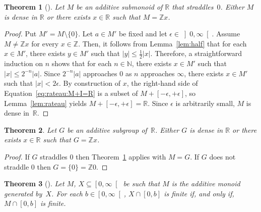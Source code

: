 \documentclass[12pt]{article}
\newcommand{\bZ}{\mathbb{Z}}
\newcommand{\bN}{\mathbb{N}} %
\newcommand{\bR}{\mathbb{R}}
\newcommand{\Rnneg}{\left[0, \infty\right[} %
\newcommand{\Rpos}{\left]0, \infty\right[} %
\newcommand{\abs}[1]{\left| #1 \right|}
\newcommand{\thalf}{\tfrac{1}{2}}
\newtheorem{theorem}{Theorem}
\theoremstyle{definition}
\begin{document}
\begin{theorem}[\cite{AbelsManoussos2012}] \label{thm:additive-submonoid-R}
  Let $M$ be an additive submonoid of $\bR$ that straddles~$0$.
  Either $M$ is dense in $\bR$ or there exists $x \in \bR$ such that $M = \bZ x$.
\end{theorem}

\begin{proof}
  Put $M' = M \setminus \{ 0 \}$.
  Let $a \in M'$ be fixed and let $\epsilon \in \Rpos$.
  Assume $M \ne \bZ x$ for every $x \in \bZ$.
  Then, it follows from Lemma~\ref{lem:half} that for each $x \in M'$,
  there exists $y \in M'$ such that $\abs{y} \le \thalf \abs{x}$.
  Therefore, a straightforward induction on $n$ shows that for each $n \in \bN$,
  there exists $x \in M'$ such that $\abs{x} \le 2^{- n} \abs{a}$.
  Since $2^{-n} \abs{a}$ approaches $0$ as $n$ approaches $\infty$,
  there exists $x \in M'$ such that $\abs{x} < 2 \epsilon$.
  By construction of $x$,
  the right-hand side of Equation~\eqref{eq:rateau:M+I=R} is a subset of $M + [- \epsilon, + \epsilon]$,
  so Lemma~\ref{lem:rateau} yields $M + [- \epsilon, + \epsilon] = \bR$.
  Since $\epsilon$ is arbitrarily small, $M$ is dense in~$\bR$.
\end{proof}


\begin{theorem} \label{thm:additive-subgroup-R}
  Let $G$ be an additive subgroup of~$\bR$.
  Either $G$ is dense in $\bR$ or there exists $x \in \bR$ such that $G = \bZ x$.
\end{theorem}


\begin{proof}
  If $G$ straddles $0$ then Theorem~\ref{thm:additive-submonoid-R} applies with $M = G$.
  If $G$ does not straddle $0$ then $G = \{ 0 \} = \bZ 0$.
\end{proof}

  

\begin{theorem}[\cite{AbelsManoussos2012}] \label{thm:additive-closure}
  Let $M$, $X \subseteq \Rnneg$ be such that $M$ is the additive monoid generated by~$X$.
  For each $b \in \Rnneg$, $X \cap [0, b]$ is finite if, and only if, $M \cap [0, b]$ is finite.
\end{theorem}
\end{document}
